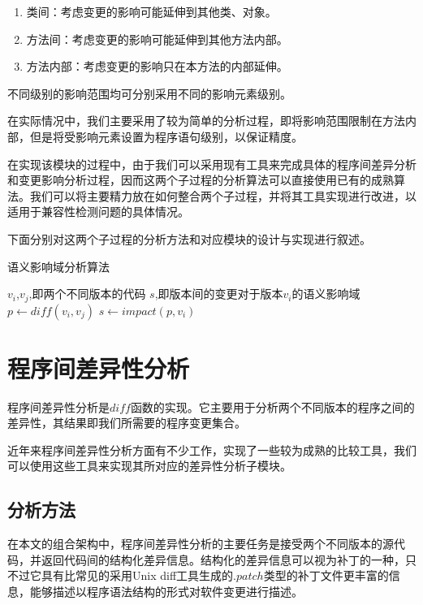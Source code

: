 \begin{enumerate}
	\item 类间：考虑变更的影响可能延伸到其他类、对象。
	\item 方法间：考虑变更的影响可能延伸到其他方法内部。
	\item 方法内部：考虑变更的影响只在本方法的内部延伸。
\end{enumerate}

不同级别的影响范围均可分别采用不同的影响元素级别。

在实际情况中，我们主要采用了较为简单的分析过程，即将影响范围限制在方法内部，但是将受影响元素设置为程序语句级别，以保证精度。

在实现该模块的过程中，由于我们可以采用现有工具来完成具体的程序间差异分析和变更影响分析过程，因而这两个子过程的分析算法可以直接使用已有的成熟算法。我们可以将主要精力放在如何整合两个子过程，并将其工具实现进行改进，以适用于兼容性检测问题的具体情况。

下面分别对这两个子过程的分析方法和对应模块的设计与实现进行叙述。

\begin{algorithm}[H]
	\caption{语义影响域分析算法}
	\label{algo_impact}
	\begin{algorithmic}[1]
		\Require $v_i$,$v_j$,即两个不同版本的代码	
		\Ensure $s$,即版本间的变更对于版本$v_i$的语义影响域
		\State $p \gets diff(v_i,v_j)$
		\State $s \gets impact(p,v_i)$
		\State{}
		\EndFunction
	\end{algorithmic}
\end{algorithm}

\section{程序间差异性分析}
\label {chap_diff}

程序间差异性分析是$diff$函数的实现。它主要用于分析两个不同版本的程序之间的差异性，其结果即我们所需要的程序变更集合。

近年来程序间差异性分析方面有不少工作，实现了一些较为成熟的比较工具，我们可以使用这些工具来实现其所对应的差异性分析子模块。

\subsection{分析方法}

在本文的组合架构中，程序间差异性分析的主要任务是接受两个不同版本的源代码，并返回代码间的结构化差异信息。结构化的差异信息可以视为补丁的一种，只不过它具有比常见的采用Unix diff工具生成的$.patch$类型的补丁文件更丰富的信息，能够描述以程序语法结构的形式对软件变更进行描述。


